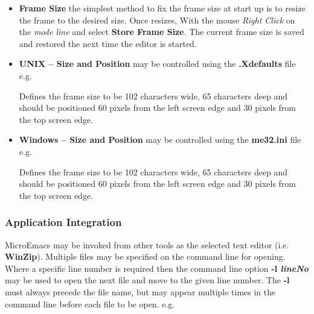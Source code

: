 \documentclass[11pt,a4paper,pdftex]{article}
\begin{document}
\begin{itemize}
\begin{itemize}
      \item \textbf{Frame Size} the simplest method to fix the frame size at
      start up is to resize the frame to the desired size. Once resizes, With
      the mouse \textit{Right Click} on the \textit{mode line} and select
      \textbf{Store Frame Size}. The current frame size is saved and restored
      the next time the editor is started.

      \item \textbf{UNIX -- Size and Position} may be controlled using the
      \textbf{.Xdefaults} file e.g.


      Defines the frame size to be 102 characters wide, 65 characters deep and
      should be positioned 60 pixels from the left screen edge and 30 pixels
      from the top screen edge.

      \item \textbf{Windows -- Size and Position} may be controlled using the
      \textbf{me32.ini} file e.g.


      Defines the frame size to be 102 characters wide, 65 characters deep and
      should be positioned 60 pixels from the left screen edge and 30 pixels
      from the top screen edge.

    \end{itemize}

  \end{itemize}

\subsubsection{Application Integration}

  MicroEmacs may be invoked from other tools as the selected text editor (i.e.
  \textbf{WinZip}). Multiple files may be specified on the command line for
  opening. Where a specific line number is required then the command line
  option \textbf{-l \textit{lineNo}} may be used to open the next file and
  move to the given line number. The \textbf{-l} must always precede the file
  name, but may appear multiple times in the command line before  each file
  to be open. e.g.

\end{document}
